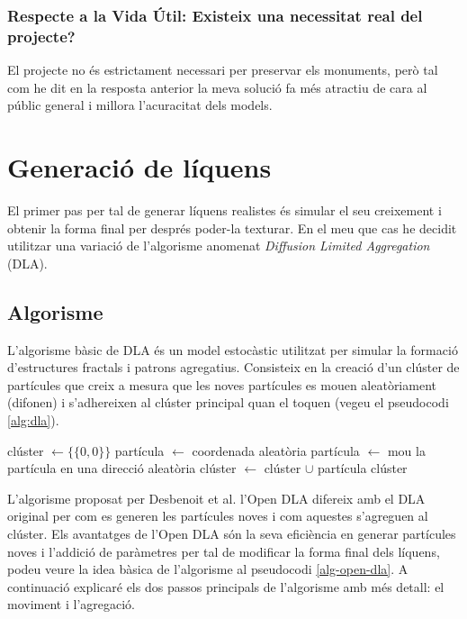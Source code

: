 \documentclass{article}
\begin{document}
\subsubsection{Respecte a la Vida Útil: Existeix una necessitat real del projecte?}

El projecte no és estrictament necessari per preservar els monuments, però tal com  he dit en la resposta anterior la meva solució fa més atractiu de cara al públic general i millora l'acuracitat dels models.

\newpage

\section{Generació de líquens}

El primer pas per tal de generar líquens realistes és simular el seu creixement i obtenir la forma final per després poder-la texturar. En el meu que cas he decidit utilitzar una variació de l'algorisme anomenat \textit{Diffusion Limited Aggregation} (DLA).

\subsection{Algorisme}

 L'algorisme bàsic de DLA és un model estocàstic utilitzat per simular la formació d'estructures fractals i patrons agregatius. Consisteix en la creació d'un clúster de partícules que creix a mesura que les noves partícules es mouen aleatòriament (difonen) i s'adhereixen al clúster principal quan el toquen (vegeu el pseudocodi \ref{alg:dla}). 

\begin{algorithm}[H]
\caption{Esquema bàsic de l'algorisme DLA}
\begin{algorithmic}[1]
\State clúster $\gets \{\{0, 0\}\}$
    \State partícula $\gets$ coordenada aleatòria
        \State partícula $\gets$ mou la partícula en una direcció aleatòria
    \EndWhile
    \State clúster $\gets$ clúster $\cup$ partícula
\EndFor
\State \Return clúster
\EndProcedure
\end{algorithmic}
\label{alg:dla}
\end{algorithm}

 L'algorisme proposat per Desbenoit et al. \cite{Simulating-and-modeling-lichen-growth} l'Open DLA difereix amb el DLA original per com es generen les partícules noves i com aquestes s'agreguen al clúster. Els avantatges de l'Open DLA són la seva eficiència en generar partícules noves i l'addició de paràmetres per tal de modificar la forma final dels líquens, podeu veure la idea bàsica de l'algorisme al pseudocodi \ref{alg-open-dla}. A continuació explicaré els dos passos principals de l'algorisme amb més detall: el moviment i l'agregació.
\end{document}
